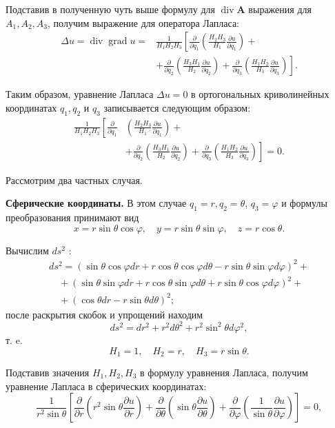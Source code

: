 Подставив в полученную чуть выше формулу для $\operatorname{div} \mathbf{A}$ выражения для $A_{1}, A_{2}, A_{3}$, получим выражение для оператора Лапласа:
\[
\begin{aligned}
	\Delta u=\operatorname{div} \operatorname{grad} u= & \frac{1}{H_{1} H_{2} H_{3}}\left[\frac{\partial}{\partial q_{1}}\left(\frac{H_{2} H_{3}}{H_{1}} \frac{\partial u}{\partial q_{1}}\right)+\right. \\
	& \left.+\frac{\partial}{\partial q_{2}}\left(\frac{H_{3} H_{1}}{H_{2}} \frac{\partial u}{\partial q_{2}}\right)+\frac{\partial}{\partial q_{3}}\left(\frac{H_{1} H_{2}}{H_{3}} \frac{\partial u}{\partial q_{3}}\right)\right] .
\end{aligned}
\]

Таким образом, уравнение Лапласа $\Delta u=0$ в ортогональных криволинейных координатах $q_{1}, q_{2}$ и $q_{3}$ записывается следующим образом:
\[
\begin{aligned}
	\frac{1}{H_{1} H_{2} H_{3}}\left[\frac{\partial}{\partial q_{1}}\right. & \left(\frac{H_{2} H_{3}}{H_{1}} \frac{\partial u}{\partial q_{1}}\right)+ \\
	& \left.+\frac{\partial}{\partial q_{2}}\left(\frac{H_{3} H_{1}}{H_{2}} \frac{\partial u}{\partial q_{2}}\right)+\frac{\partial}{\partial q_{3}}\left(\frac{H_{1} H_{2}}{H_{3}} \frac{\partial u}{\partial q_{3}}\right)\right]=0 .
\end{aligned}
\]

Рассмотрим два частных случая.

\textbf{Сферические координаты.} В этом случае $q_{1}=r, q_{2}=\theta$, $q_{3}=\varphi$ и формулы преобразования принимают вид
\[
x=r \sin \theta \cos \varphi, \quad y=r \sin \theta \sin \varphi, \quad z=r \cos \theta .
\]

Вычислим $d s^{2}$ :
\[
\begin{aligned}
	d s^{2}=(\sin \theta \cos \varphi d r+r \cos \theta \cos \varphi d \theta-r \sin \theta \sin \varphi d \varphi)^{2}+ \\
	\quad+(\sin \theta \sin \varphi d r+r \cos \theta \sin \varphi d \theta+r \sin \theta \cos \varphi d \varphi)^{2}+ \\
	\quad+(\cos \theta d r-r \sin \theta d \theta)^{2} ;
\end{aligned}
\]
после раскрытия скобок и упрощений находим
\[
d s^{2}=d r^{2}+r^{2} d \theta^{2}+r^{2} \sin ^{2} \theta d \varphi^{2},
\]
т. e.
\[
H_{1}=1, \quad H_{2}=r, \quad H_{3}=r \sin \theta .
\]

Подставив значения $H_{1}, H_{2}, H_{3}$ в формулу уравнения Лапласа, получим уравнение Лапласа в сферических координатах:
\[
\frac{1}{r^{2} \sin \theta}\left[\frac{\partial}{\partial r}\left(r^{2} \sin \theta \frac{\partial u}{\partial r}\right)+\frac{\partial}{\partial \theta}\left(\sin \theta \frac{\partial u}{\partial \theta}\right)+\frac{\partial}{\partial \varphi}\left(\frac{1}{\sin \theta} \frac{\partial u}{\partial \varphi}\right)\right]=0,
\]

